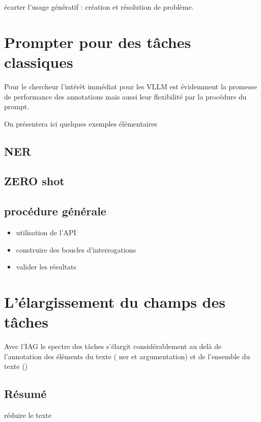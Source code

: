 \documentclass[
  letterpaper,
  DIV=11,
  numbers=noendperiod]{scrreprt}
\providecommand{\tightlist}{%
  \setlength{\itemsep}{0pt}\setlength{\parskip}{0pt}}\usepackage{longtable,booktabs,array}
\begin{document}
écarter l'usage génératif : création et résolution de problème.

\section{Prompter pour des tâches
classiques}\label{prompter-pour-des-tuxe2ches-classiques}

Pour le chercheur l'intérêt immédiat pour les VLLM est évidemment la
promesse de performance des annotations mais aussi leur flexibilité par
la procédure du prompt.

On présentera ici quelques exemples élémentaires

\subsection{NER}\label{ner}

\subsection{ZERO shot}\label{zero-shot}

\subsection{procédure générale}\label{procuxe9dure-guxe9nuxe9rale}

\begin{itemize}
\tightlist
\item
  utilisation de l'API
\item
  construire des boucles d'interrogations
\item
  valider les résultats
\end{itemize}

\section{L'élargissement du champs des
tâches}\label{luxe9largissement-du-champs-des-tuxe2ches}

Avec l'IAG le spectre des tâches s'élargit considérablement au delà de
l'annotation des éléments du texte ( ner et argumentation) et de
l'ensemble du texte ()

\subsection{Résumé}\label{ruxe9sumuxe9}

réduire le texte
\end{document}
